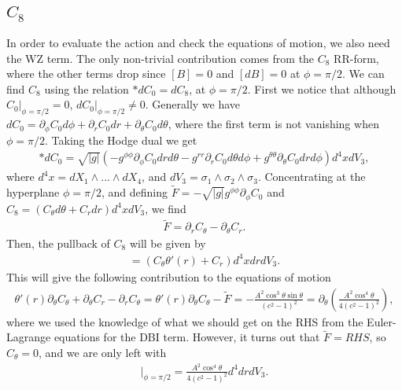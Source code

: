 \documentclass[11pt]{article}
\newcommand{\sfrac}[2]{{\textstyle\frac{#1}{#2}}}
\newcommand{\p}{\partial}\newcommand{\quarter}{\sfrac{1}{4}}
\begin{document}
\subsection{$C_8$}
In order to evaluate the action and check the equations of motion, we also need the WZ term.
The only non-trivial contribution comes from the $C_8$ RR-form, where the other terms drop since $[B] = 0$ and $[d B] = 0$ at $\phi = \pi/2$.
We can find $C_8$ using the relation $\ast d C_0 = d C_8$, at $\phi = \pi/2$.
First we notice that although $C_0|_{\phi = \pi/2} = 0$, $d C_0|_{\phi = \pi/2} \neq 0$.
Generally we have $d C_0 = \p_\phi C_0 d\phi + \p_r C_0 d r + \p_\theta C_0 d\theta$, where the first term is not vanishing when $\phi = \pi/2$.
Taking the Hodge dual we get 
\begin{align}
\ast d C_0 = \sqrt{|g|}\left(-g^{\phi\phi}\p_\phi C_0 d r d\theta - g^{rr}\p_r C_0 d \theta d \phi + g^{\theta \theta}\p_\theta C_0 d r d\phi\right)d^4 x d V_3,
\end{align}
where $d^4 x = d X_1 \wedge ... \wedge dX_4$, and $dV_3 = \sigma_1 \wedge \sigma_2 \wedge \sigma_3$.    
Concentrating at the hyperplane $\phi = \pi/2$, and defining $\tilde F = -\sqrt{|g|}g^{\phi\phi}\p_\phi C_0$ and $C_8 = \left(C_\theta d\theta + C_r d r\right)d^4 x dV_3$, we find
\begin{align}
\tilde F = \p_r C_\theta - \p_\theta C_r.
\end{align}
Then, the pullback of $C_8$ will be given by 
\begin{align}
[C_8] = \left(C_\theta \theta'(r) + C_r \right)d^4 x d r dV_3.
\end{align}
This will give the following contribution to the equations of motion
\begin{align}
\theta'(r) \p_\theta C_\theta  + \p_\theta C_r - \p_r C_\theta = \theta'(r) \p_\theta C_\theta - \tilde F
=
-\frac{A^2 \cos^3 \theta \sin\theta}{(c^2-1)^2} = \p_\theta\left(\frac{A^2 \cos^4\theta}{4(c^2-1)^2}\right),
\end{align}
where we used the knowledge of what we should get on the RHS from the Euler-Lagrange equations for the DBI term.
However, it turns out that $\tilde F = RHS$, so $C_\theta = 0$, and we are only left with 
\begin{align}
[C_8]|_{\phi = \pi/2} = \frac{A^2 \cos^4\theta}{4(c^2-1)^2}d^4 dr dV_3.
\end{align}
\end{document}
